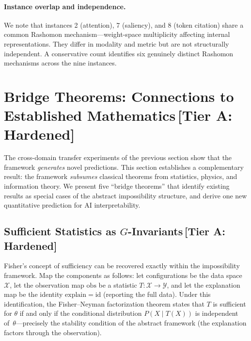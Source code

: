 \documentclass[11pt,a4paper]{article}
\begin{document}
\paragraph{Instance overlap and independence.}
We note that instances 2 (attention), 7 (saliency), and 8 (token citation)
share a common Rashomon mechanism---weight-space multiplicity affecting
internal representations.  They differ in modality and metric but are not
structurally independent.  A conservative count identifies six genuinely
distinct Rashomon mechanisms across the nine instances.

\section{Bridge Theorems: Connections to Established Mathematics\,\textnormal{\normalsize[Tier A: Hardened]}}
\label{sec:bridge-theorems}

The cross-domain transfer experiments of the previous section show that the
framework \emph{generates} novel predictions.  This section establishes a
complementary result: the framework \emph{subsumes} classical theorems from
statistics, physics, and information theory.  We present five ``bridge
theorems'' that identify existing results as special cases of the abstract
impossibility structure, and derive one new quantitative prediction for AI
interpretability.

\subsection{Sufficient Statistics as $G$-Invariants\,\textnormal{\normalsize[Tier A: Hardened]}}
\label{sec:bridge-sufficiency}

Fisher's concept of sufficiency \citep{fisher1922mathematical} can be
recovered exactly within the impossibility framework.  Map the components as
follows: let configurations be the data space~$\mathcal{X}$, let the
observation map $\mathrm{obs}$ be a statistic $T\colon \mathcal{X} \to
\mathcal{Y}$, and let the explanation map be the identity $\mathrm{explain} =
\mathrm{id}$ (reporting the full data).  Under this identification, the
Fisher--Neyman factorization theorem \citep{neyman1935su} states that $T$ is
sufficient for $\theta$ if and only if the conditional distribution
$P(X \mid T(X))$ is independent of~$\theta$---precisely the stability
condition of the abstract framework (the explanation factors through the
observation).
\end{document}
